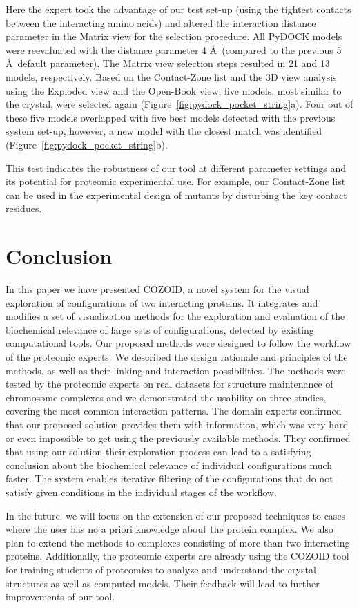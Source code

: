 \documentclass{bmcart}
\def\OpBook {Open-Book view\xspace}
\def\ExpView {Exploded view\xspace}
\def\MatView {Matrix view\xspace}
\def\CoZoList{Contact-Zone list\xspace}
\begin{document}
Here the expert took the advantage of our test set-up (using the tightest contacts between the interacting amino acids) and altered the interaction distance parameter in the \MatView for the selection procedure. 
All PyDOCK models were reevaluated with the distance parameter 4 \AA~(compared to the previous 5 \AA~default parameter). 
The \MatView selection steps resulted in 21 and 13 models, respectively. 
Based on the \CoZoList and the 3D view analysis using the \ExpView and the \OpBook, five models, most similar to the crystal, were selected again (Figure~\ref{fig:pydock_pocket_string}a). Four out of these five models overlapped with five best models detected with the previous system set-up, however, a new model with the closest match was identified (Figure~\ref{fig:pydock_pocket_string}b).

This test indicates the robustness of our tool at different parameter settings and its potential for proteomic experimental use. 
For example, our \CoZoList can be used in the experimental design of mutants by disturbing the key contact residues. 


\section{Conclusion}
In this paper we have presented COZOID, a novel system for the visual exploration of configurations of two interacting proteins. 
It integrates and modifies a set of visualization methods for the exploration and evaluation of the biochemical relevance of large sets of configurations, detected by existing computational tools.
Our proposed methods were designed to follow the workflow of the proteomic experts.
We described the design rationale and principles of the methods, as well as their linking and interaction possibilities. 
The methods were tested by the proteomic experts on real datasets for structure maintenance of chromosome complexes and we demonstrated the usability on three studies, covering the most common interaction patterns.
The domain experts confirmed that our proposed solution provides them with information, which was very hard or even impossible to get using the previously available methods.
They confirmed that using our solution their exploration process can lead to a satisfying conclusion about the biochemical relevance of individual configurations much faster.
The system enables iterative filtering of the configurations that do not satisfy given conditions in the individual stages of the workflow.

In the future. we will focus on the extension of our proposed techniques to cases where the user has no a priori knowledge about the protein complex.
We also plan to extend the methods to complexes consisting of more than two interacting proteins. 
Additionally, the proteomic experts are already using the COZOID tool for training students of proteomics to analyze and understand the crystal structures as well as computed models.
Their feedback will lead to further improvements of our tool.
\end{document}
